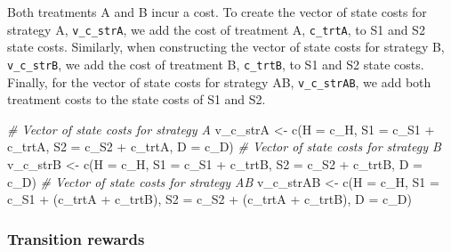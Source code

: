 \documentclass[
]{article}
\newenvironment{Shaded}{\begin{snugshade}}{\end{snugshade}}
\newcommand{\AttributeTok}[1]{\textcolor[rgb]{0.77,0.63,0.00}{#1}}
\newcommand{\CommentTok}[1]{\textcolor[rgb]{0.56,0.35,0.01}{\textit{#1}}}
\newcommand{\FunctionTok}[1]{\textcolor[rgb]{0.00,0.00,0.00}{#1}}
\newcommand{\NormalTok}[1]{#1}
\newcommand{\OtherTok}[1]{\textcolor[rgb]{0.56,0.35,0.01}{#1}}
\newcommand{\SpecialCharTok}[1]{\textcolor[rgb]{0.00,0.00,0.00}{#1}}
\begin{document}
Both treatments A and B incur a cost. To create the vector of state costs for strategy A, \texttt{v\_c\_strA}, we add the cost of treatment A, \texttt{c\_trtA}, to S1 and S2 state costs. Similarly, when constructing the vector of state costs for strategy B, \texttt{v\_c\_strB}, we add the cost of treatment B, \texttt{c\_trtB}, to S1 and S2 state costs. Finally, for the vector of state costs for strategy AB, \texttt{v\_c\_strAB}, we add both treatment costs to the state costs of S1 and S2.

\begin{Shaded}
\begin{Highlighting}[]
\CommentTok{\# Vector of state costs for strategy A}
\NormalTok{v\_c\_strA }\OtherTok{\textless{}{-}} \FunctionTok{c}\NormalTok{(}\AttributeTok{H  =}\NormalTok{ c\_H, }
              \AttributeTok{S1 =}\NormalTok{ c\_S1 }\SpecialCharTok{+}\NormalTok{ c\_trtA, }
              \AttributeTok{S2 =}\NormalTok{ c\_S2 }\SpecialCharTok{+}\NormalTok{ c\_trtA, }
              \AttributeTok{D  =}\NormalTok{ c\_D)}
\CommentTok{\# Vector of state costs for strategy B}
\NormalTok{v\_c\_strB }\OtherTok{\textless{}{-}} \FunctionTok{c}\NormalTok{(}\AttributeTok{H  =}\NormalTok{ c\_H, }
              \AttributeTok{S1 =}\NormalTok{ c\_S1 }\SpecialCharTok{+}\NormalTok{ c\_trtB, }
              \AttributeTok{S2 =}\NormalTok{ c\_S2 }\SpecialCharTok{+}\NormalTok{ c\_trtB, }
              \AttributeTok{D  =}\NormalTok{ c\_D)}
\CommentTok{\# Vector of state costs for strategy AB}
\NormalTok{v\_c\_strAB }\OtherTok{\textless{}{-}} \FunctionTok{c}\NormalTok{(}\AttributeTok{H  =}\NormalTok{ c\_H, }
               \AttributeTok{S1 =}\NormalTok{ c\_S1 }\SpecialCharTok{+}\NormalTok{ (c\_trtA }\SpecialCharTok{+}\NormalTok{ c\_trtB), }
               \AttributeTok{S2 =}\NormalTok{ c\_S2 }\SpecialCharTok{+}\NormalTok{ (c\_trtA }\SpecialCharTok{+}\NormalTok{ c\_trtB), }
               \AttributeTok{D  =}\NormalTok{ c\_D)}
\end{Highlighting}
\end{Shaded}

\hypertarget{transition-rewards}{%
\subsubsection{Transition rewards}\label{transition-rewards}}
\end{document}
